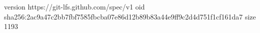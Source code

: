 version https://git-lfs.github.com/spec/v1
oid sha256:2ac9a47c2bb7fbf7585fbcba07e86d12b89b83a44e9ff9c2d4d751f1cf161da7
size 1193
